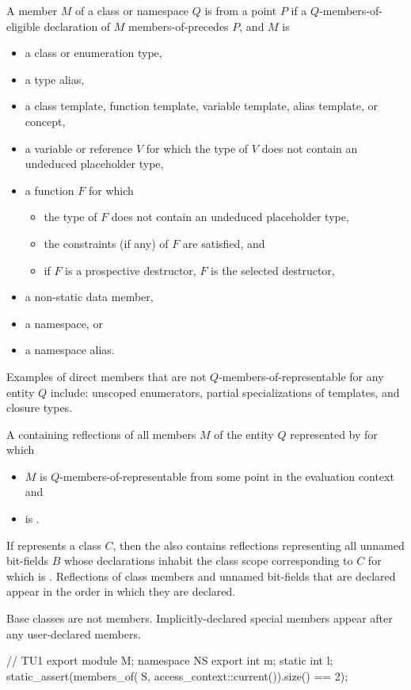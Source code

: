 \begin{itemdescr}
\pnum
A member $M$ of a class or namespace $Q$ is
 from a point $P$
if a $Q$-members-of-eligible declaration of $M$ members-of-precedes $P$,
and $M$ is
\begin{itemize}
\item
  a class or enumeration type,
\item
  a type alias,
\item
  a class template, function template,
  variable template, alias template, or concept,
\item
  a variable or reference $V$
  for which the type of $V$ does not contain an undeduced placeholder type,
\item
  a function $F$ for which
  \begin{itemize}
  \item
    the type of $F$  does not contain an undeduced placeholder type,
  \item
    the constraints (if any) of $F$ are satisfied, and
  \item
    if $F$ is a prospective destructor,
    $F$ is the selected destructor,
  \end{itemize}
\item
  a non-static data member,
\item
  a namespace, or
\item
  a namespace alias.
\end{itemize}
\begin{note}
Examples of direct members that are not $Q$-members-of-representable
for any entity $Q$ include:
unscoped enumerators,
partial specializations of templates, and
closure types.
\end{note}

\pnum
\returns
A  containing reflections of all members $M$
of the entity $Q$ represented by  for which
\begin{itemize}
\item
  $M$ is $Q$-members-of-representable
  from some point in the evaluation context and
\item
   is .
\end{itemize}
If  represents a class $C$,
then the  also contains reflections
representing all unnamed bit-fields $B$
whose declarations inhabit the class scope corresponding to $C$
for which  is .
Reflections of class members and unnamed bit-fields that are declared
appear in the order in which they are declared.
\begin{note}
Base classes are not members.
Implicitly-declared special members
appear after any user-declared members.
\end{note}
\begin{example}
\begin{codeblock}
// TU1
export module M;
namespace NS {
  export int m;
  static int l;
}
static_assert(members_of(^^NS, access_context::current()).size() == 2);


\end{codeblock}
\end{example}
\end{itemdescr}
